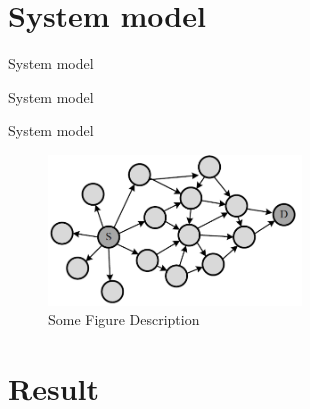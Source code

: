 \documentclass{beamer}
\begin{document}
\section{System model}
\begin{frame}{System model}
\end{frame}

\begin{frame}{System model}
    
\end{frame}

\begin{frame}{System model}
    \begin{figure}[t]
        \centering
        \includegraphics[width=0.6\textwidth]{figures/Fig_1-1.png}
        \caption{Some Figure Description}
    \end{figure}
\end{frame}

\section{Result}
\end{document}
